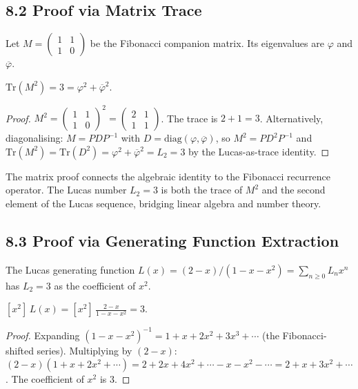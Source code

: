 \subsection{8.2 Proof via Matrix Trace}

Let $M = \begin{pmatrix} 1 & 1 \\ 1 & 0 \end{pmatrix}$ be the
Fibonacci companion matrix. Its eigenvalues are $\varphi$ and
$\overline{\varphi}$.

\begin{theorem}
\label{fa_03:thm:anchor-matrix}
$\mathrm{Tr}(M^{2}) = 3 = \varphi^{2} + \overline{\varphi}^{2}$.
\end{theorem}

\begin{proof}
$M^{2} = \begin{pmatrix} 1 & 1 \\ 1 & 0 \end{pmatrix}^{2}
= \begin{pmatrix} 2 & 1 \\ 1 & 1 \end{pmatrix}$.
The trace is $2 + 1 = 3$. Alternatively, diagonalising:
$M = PDP^{-1}$ with $D = \mathrm{diag}(\varphi,
\overline{\varphi})$, so $M^{2} = PD^{2}P^{-1}$ and
$\mathrm{Tr}(M^{2}) = \mathrm{Tr}(D^{2}) = \varphi^{2} +
\overline{\varphi}^{2} = L_{2} = 3$ by the Lucas-as-trace
identity.
\end{proof}

The matrix proof connects the algebraic identity to the Fibonacci
recurrence operator. The Lucas number $L_{2} = 3$ is both the trace
of $M^{2}$ and the second element of the Lucas sequence, bridging
linear algebra and number theory.

\subsection{8.3 Proof via Generating Function Extraction}

The Lucas generating function
$L(x) = (2-x)/(1-x-x^{2}) = \sum_{n \ge 0} L_{n} x^{n}$
has $L_{2} = 3$ as the coefficient of $x^{2}$.

\begin{theorem}
\label{fa_03:thm:anchor-genfn}
$[x^{2}]\, L(x) = [x^{2}]\, \frac{2-x}{1-x-x^{2}} = 3$.
\end{theorem}

\begin{proof}
Expanding $(1-x-x^{2})^{-1} = 1 + x + 2x^{2} + 3x^{3} + \cdots$
(the Fibonacci-shifted series). Multiplying by $(2-x)$:
$(2-x)(1 + x + 2x^{2} + \cdots) = 2 + 2x + 4x^{2} + \cdots - x
- x^{2} - \cdots = 2 + x + 3x^{2} + \cdots$.
The coefficient of $x^{2}$ is $3$.
\end{proof}

